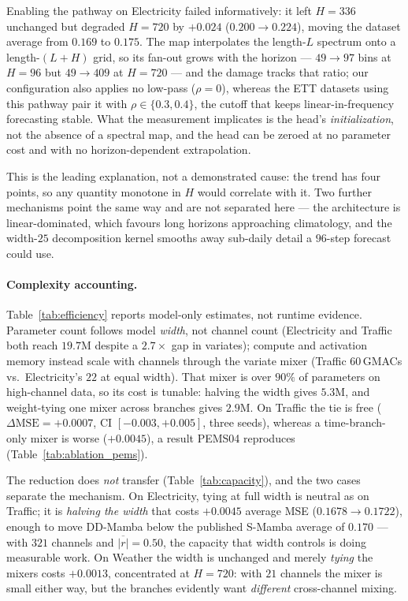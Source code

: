 \documentclass[review,12pt]{elsarticle}
\newcommand{\model}{DD-Mamba}
\begin{document}
Enabling the pathway on Electricity failed informatively: it left $H{=}336$
unchanged but degraded $H{=}720$ by $+0.024$ ($0.200\rightarrow0.224$),
moving the dataset average from $0.169$ to $0.175$. The map interpolates the
length-$L$ spectrum onto a length-$(L{+}H)$ grid, so its fan-out grows with
the horizon --- $49\rightarrow97$ bins at $H{=}96$ but $49\rightarrow409$ at
$H{=}720$ --- and the damage tracks that ratio; our configuration also
applies no low-pass ($\rho{=}0$), whereas the ETT datasets using this pathway
pair it with $\rho\in\{0.3,0.4\}$, the cutoff that keeps linear-in-frequency
forecasting stable. What the measurement implicates is the head's
\emph{initialization}, not the absence of a spectral map, and the head can be
zeroed at no parameter cost and with no horizon-dependent extrapolation.

This is the leading explanation, not a demonstrated cause: the trend has four
points, so any quantity monotone in $H$ would correlate with it. Two further
mechanisms point the same way and are not separated here --- the architecture
is linear-dominated, which favours long horizons approaching climatology, and
the width-$25$ decomposition kernel smooths away sub-daily detail a $96$-step
forecast could use.

\paragraph{Complexity accounting.} Table~\ref{tab:efficiency} reports
model-only estimates, not runtime evidence. Parameter count follows model
\emph{width}, not channel count (Electricity and Traffic both reach $19.7$M
despite a $2.7{\times}$ gap in variates); compute and activation memory
instead scale with channels through the variate mixer (Traffic $60$\,GMACs
vs.\ Electricity's $22$ at equal width). That mixer is over $90\%$ of
parameters on high-channel data, so its cost is tunable: halving the width
gives $5.3$M, and weight-tying one mixer across branches gives $2.9$M. On
Traffic the tie is free ($\Delta\mathrm{MSE}=+0.0007$, CI $[-0.003,+0.005]$,
three seeds), whereas a time-branch-only mixer is worse ($+0.0045$), a result
PEMS04 reproduces (Table~\ref{tab:ablation_pems}).

The reduction does \emph{not} transfer (Table~\ref{tab:capacity}), and the two
cases separate the mechanism. On Electricity, tying at full width is neutral
as on Traffic; it is \emph{halving the width} that costs $+0.0045$ average MSE
($0.1678\!\rightarrow\!0.1722$), enough to move \model{} below the published
S-Mamba average of $0.170$ --- with $321$ channels and $\overline{|r|}{=}0.50$,
the capacity that width controls is doing measurable work. On Weather the
width is unchanged and merely \emph{tying} the mixers costs $+0.0013$,
concentrated at $H{=}720$: with $21$ channels the mixer is small either way,
but the branches evidently want \emph{different} cross-channel mixing.
\end{document}
